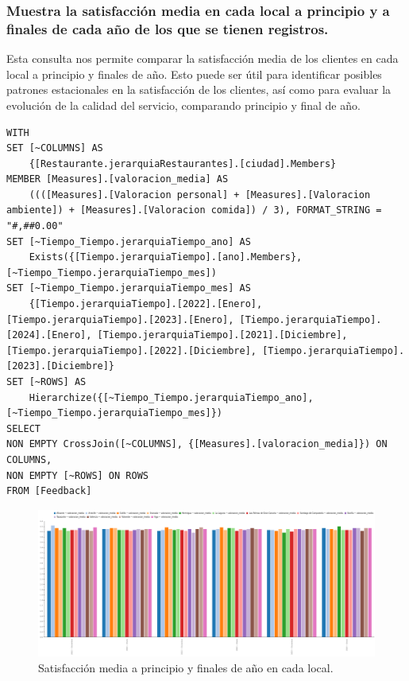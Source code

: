 \documentclass[11pt]{opticajnl}
\begin{document}
\subsubsection{Muestra la satisfacción media en cada local a principio y a finales de cada año de los que se tienen registros.}

Esta consulta nos permite comparar la satisfacción media de los clientes en cada local a principio y finales de año. Esto puede ser útil para identificar posibles patrones estacionales en la satisfacción de los clientes, así como para evaluar la evolución de la calidad del servicio, comparando principio y final de año.

\begin{lstlisting}[style=terminal]
WITH
SET [~COLUMNS] AS
    {[Restaurante.jerarquiaRestaurantes].[ciudad].Members}
MEMBER [Measures].[valoracion_media] AS
    ((([Measures].[Valoracion personal] + [Measures].[Valoracion ambiente]) + [Measures].[Valoracion comida]) / 3), FORMAT_STRING = "#,##0.00"
SET [~Tiempo_Tiempo.jerarquiaTiempo_ano] AS
    Exists({[Tiempo.jerarquiaTiempo].[ano].Members}, [~Tiempo_Tiempo.jerarquiaTiempo_mes])
SET [~Tiempo_Tiempo.jerarquiaTiempo_mes] AS
    {[Tiempo.jerarquiaTiempo].[2022].[Enero], [Tiempo.jerarquiaTiempo].[2023].[Enero], [Tiempo.jerarquiaTiempo].[2024].[Enero], [Tiempo.jerarquiaTiempo].[2021].[Diciembre], [Tiempo.jerarquiaTiempo].[2022].[Diciembre], [Tiempo.jerarquiaTiempo].[2023].[Diciembre]}
SET [~ROWS] AS
    Hierarchize({[~Tiempo_Tiempo.jerarquiaTiempo_ano], [~Tiempo_Tiempo.jerarquiaTiempo_mes]})
SELECT
NON EMPTY CrossJoin([~COLUMNS], {[Measures].[valoracion_media]}) ON COLUMNS,
NON EMPTY [~ROWS] ON ROWS
FROM [Feedback]
\end{lstlisting}

\begin{figure}[H]
    \centering
    \includegraphics[width=\textwidth]{fotos/valoracionMediaEneroDiciembre.png}
    \caption{Satisfacción media a principio y finales de año en cada local.}
    \label{fig:consulta5}
\end{figure}
\end{document}
